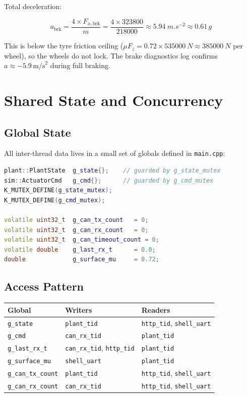 \documentclass[11pt,a4paper]{article}
\begin{document}
Total deceleration:

\begin{equation}
  a_{\text{brk}} = \frac{4 \times F_{x,\text{brk}}}{m} = \frac{4 \times 323800}{218000} \approx \SI{5.94}{m.s^{-2}} \approx 0.61\,g
\end{equation}

This is below the tyre friction ceiling
($\mu F_z = 0.72 \times \SI{535000}{N} \approx \SI{385000}{N}$ per wheel),
so the wheels do not lock. The brake diagnostics log confirms
$a \approx -5.9\,\text{m/s}^2$ during full braking.

\section{Shared State and Concurrency}

\subsection{Global State}

All inter-thread data lives in a small set of globals defined in
\texttt{main.cpp}:

\begin{lstlisting}[language=C++, caption={Shared globals in main.cpp}]
plant::PlantState  g_state{};    // guarded by g_state_mutex
sim::ActuatorCmd   g_cmd{};      // guarded by g_cmd_mutex
K_MUTEX_DEFINE(g_state_mutex);
K_MUTEX_DEFINE(g_cmd_mutex);

volatile uint32_t  g_can_tx_count   = 0;
volatile uint32_t  g_can_rx_count   = 0;
volatile uint32_t  g_can_timeout_count = 0;
volatile double    g_last_rx_t      = 0.0;
double             g_surface_mu     = 0.72;
\end{lstlisting}

\subsection{Access Pattern}

\begin{center}
\begin{tabular}{lll}
\toprule
Global & Writers & Readers \\
\midrule
\texttt{g\_state} & \texttt{plant\_tid} & \texttt{http\_tid}, \texttt{shell\_uart} \\
\texttt{g\_cmd} & \texttt{can\_rx\_tid} & \texttt{plant\_tid} \\
\texttt{g\_last\_rx\_t} & \texttt{can\_rx\_tid}, \texttt{http\_tid} & \texttt{plant\_tid} \\
\texttt{g\_surface\_mu} & \texttt{shell\_uart} & \texttt{plant\_tid} \\
\texttt{g\_can\_tx\_count} & \texttt{plant\_tid} & \texttt{http\_tid}, \texttt{shell\_uart} \\
\texttt{g\_can\_rx\_count} & \texttt{can\_rx\_tid} & \texttt{http\_tid}, \texttt{shell\_uart} \\
\bottomrule
\end{tabular}
\end{center}
\end{document}
